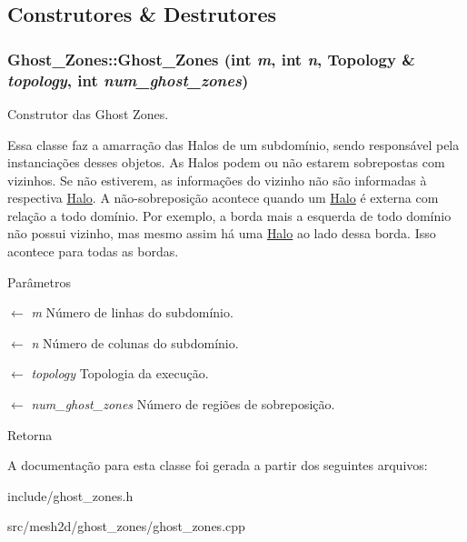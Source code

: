 \subsection{Construtores \& Destrutores}
\hypertarget{classGhost__Zones_afabe1aca266df8a6997600b42f507f83}{
\subsubsection[{Ghost\_\-Zones}]{\setlength{\rightskip}{0pt plus 5cm}Ghost\_\-Zones::Ghost\_\-Zones (int {\em m}, \/  int {\em n}, \/  {\bf Topology} \& {\em topology}, \/  int {\em num\_\-ghost\_\-zones})}}
\label{classGhost__Zones_afabe1aca266df8a6997600b42f507f83}


Construtor das Ghost Zones. 

Essa classe faz a amarração das Halos de um subdomínio, sendo responsável pela instanciações desses objetos. As Halos podem ou não estarem sobrepostas com vizinhos. Se não estiverem, as informações do vizinho não são informadas à respectiva \hyperlink{classHalo}{Halo}. A não-\/sobreposição acontece quando um \hyperlink{classHalo}{Halo} é externa com relação a todo domínio. Por exemplo, a borda mais a esquerda de todo domínio não possui vizinho, mas mesmo assim há uma \hyperlink{classHalo}{Halo} ao lado dessa borda. Isso acontece para todas as bordas.


\begin{DoxyParams}{Parâmetros}
\item[\mbox{$\leftarrow$} {\em m}]Número de linhas do subdomínio. \item[\mbox{$\leftarrow$} {\em n}]Número de colunas do subdomínio. \item[\mbox{$\leftarrow$} {\em topology}]Topologia da execução. \item[\mbox{$\leftarrow$} {\em num\_\-ghost\_\-zones}]Número de regiões de sobreposição. \end{DoxyParams}
\begin{DoxyReturn}{Retorna}

\end{DoxyReturn}


A documentação para esta classe foi gerada a partir dos seguintes arquivos:\begin{DoxyCompactItemize}
\item 
include/ghost\_\-zones.h\item 
src/mesh2d/ghost\_\-zones/ghost\_\-zones.cpp\end{DoxyCompactItemize}

